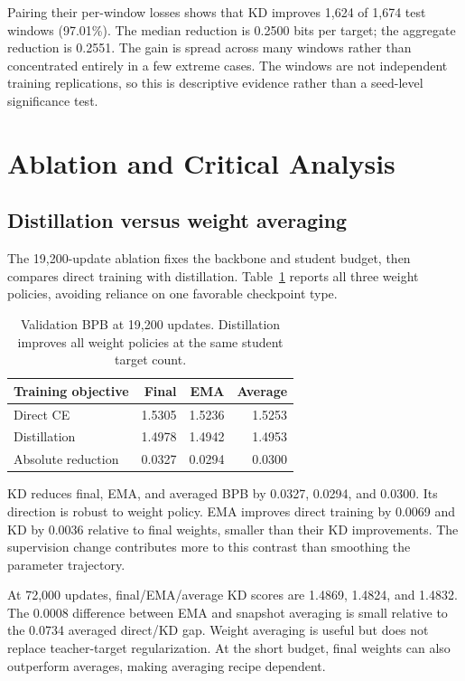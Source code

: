\documentclass[10pt,twocolumn,letterpaper]{article}
\begin{document}
Pairing their per-window losses shows that KD improves 1,624 of 1,674 test
windows (97.01\%). The median reduction is 0.2500 bits per target; the
aggregate reduction is 0.2551. The gain is spread across many windows rather
than concentrated entirely in a few extreme cases. The windows are not
independent training replications, so this is descriptive evidence rather
than a seed-level significance test.

\section{Ablation and Critical Analysis}
\subsection{Distillation versus weight averaging}
The 19,200-update ablation fixes the backbone and student budget, then
compares direct training with distillation. Table~\ref{tab:kd} reports all
three weight policies, avoiding reliance on one favorable checkpoint type.

\begin{table}[t]
\centering\small
\begin{tabular*}{\columnwidth}{@{\extracolsep{\fill}}lrrr@{}}
\toprule
Training objective & Final & EMA & Average\\
\midrule
Direct CE & 1.5305 & 1.5236 & 1.5253\\
Distillation & 1.4978 & 1.4942 & 1.4953\\
\midrule
Absolute reduction & 0.0327 & 0.0294 & 0.0300\\
\bottomrule
\end{tabular*}
\caption{Validation BPB at 19,200 updates. Distillation improves all
weight policies at the same student target count.}
\label{tab:kd}
\end{table}

KD reduces final, EMA, and averaged BPB by 0.0327, 0.0294, and 0.0300.
Its direction is robust to weight policy. EMA improves direct training by
0.0069 and KD by 0.0036 relative to final weights, smaller than their KD
improvements. The supervision change contributes more to this contrast
than smoothing the parameter trajectory.

At 72,000 updates, final/EMA/average KD scores are 1.4869, 1.4824, and
1.4832. The 0.0008 difference between EMA and snapshot averaging is small
relative to the 0.0734 averaged direct/KD gap. Weight averaging is useful
but does not replace teacher-target regularization. At the short budget,
final weights can also outperform averages, making averaging recipe dependent.
\end{document}
